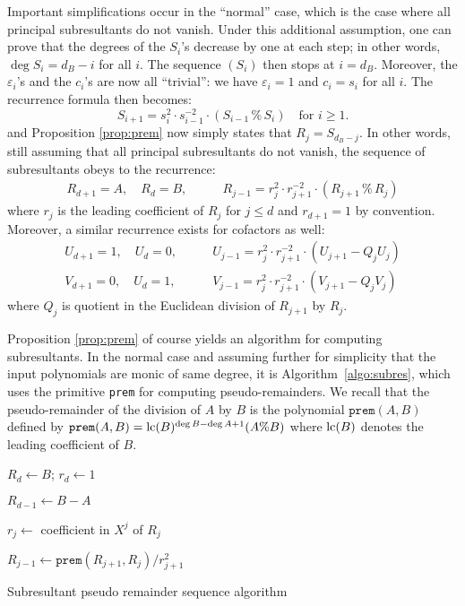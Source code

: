 \documentclass{jT}
\numberwithin{equation}{section}
\theoremstyle{definition}
\newcommand{\lc}{\text{\rm lc}}
\begin{document}
Important simplifications occur in the ``normal'' case, which is the 
case where all principal subresultants do not vanish. Under this 
additional assumption, one can prove that the degrees of the $S_i$'s 
decrease by one at each step; in other words, $\deg S_i = d_B - i$ for 
all $i$. The sequence $(S_i)$ then stops at $i = d_B$. Moreover, the 
$\varepsilon_i$'s and the $c_i$'s are now all ``trivial'': we have 
$\varepsilon_i = 1$ and $c_i = s_i$ for all $i$. The recurrence formula 
then becomes:
$$S_{i+1} = s_i^2 \cdot s_{i-1}^{-2}
\cdot (S_{i-1} \,\%\, S_i) \quad \text{for } i \geq 1.$$
and Proposition \ref{prop:prem} now simply states that $R_j = 
S_{d_B-j}$. In other words, still assuming that all principal 
subresultants do not vanish, the sequence of subresultants obeys to the 
recurrence:
\begin{align}
\label{eq:recRj}
R_{d+1} = A, \quad R_d = B, & \qquad
R_{j-1} = r_j^2 \cdot r_{j+1}^{-2}
\cdot (R_{j+1} \,\%\, R_j) 
\end{align}
where $r_j$ is the leading coefficient of $R_j$ for $j \leq d$ and $r_{d+1}
= 1$ by convention. Moreover, a similar 
recurrence exists for cofactors as well:
\begin{align}
U_{d+1} = 1, \quad U_d = 0, & \qquad
U_{j-1} = r_j^2 \cdot r_{j+1}^{-2}
\cdot (U_{j+1} - Q_j U_j) \label{eq:recUj} \\
V_{d+1} = 0, \quad U_d = 1, &\qquad
V_{j-1} = r_j^2 \cdot r_{j+1}^{-2}
\cdot (V_{j+1} - Q_j V_j) \label{eq:recVj}
\end{align}
where $Q_j$ is quotient in the Euclidean division of $R_{j+1}$ by $R_j$.

Proposition \ref{prop:prem} of course yields an algorithm for computing 
subresultants. In the normal case and assuming further for simplicity 
that the input polynomials are monic of same degree, it is 
Algorithm~\ref{algo:subres}, which uses the primitive \texttt{prem} for 
computing pseudo-remainders. We recall that the pseudo-remainder of the 
division of $A$ by $B$ is the polynomial $\texttt{prem}(A,B)$ defined by 
$\texttt{prem}(A,B) = \lc(B)^{\deg B-\deg A+1} (A \% B)$ where $\lc(B)$ 
denotes the leading coefficient of $B$.

\begin{algorithm}

  \BlankLine

  $R_d \leftarrow B$; $r_d \leftarrow 1$

  $R_{d-1} \leftarrow B-A$

    {$r_j \leftarrow$ coefficient in $X^j$ of $R_j$


     $R_{j-1} \leftarrow \texttt{prem}(R_{j+1}, R_j) / r_{j+1}^2$
    }

\caption{Subresultant pseudo remainder sequence algorithm}
\label{algo:subres}
\end{algorithm}
\end{document}
